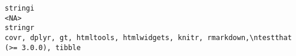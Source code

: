 \documentclass[
  letterpaper,
  DIV=11,
  numbers=noendperiod]{scrreprt}
\begin{document}
\begin{verbatim}
stringi                                                                                                                                                                                                                                                                                                                                                                                                                                                                                                                                                                                                                                                                                                                                                                                                                                                                                                                                                                                                                                                                                                                                                                                                                                                                                                  <NA>
stringr                                                                                                                                                                                                                                                                                                                                                                                                                                                                                                                                                                                                                                                                                                                                                                                                                                                                                                                                                                                                                                                                                                                                                                                                               covr, dplyr, gt, htmltools, htmlwidgets, knitr, rmarkdown,\ntestthat (>= 3.0.0), tibble

\end{verbatim}
\end{document}
